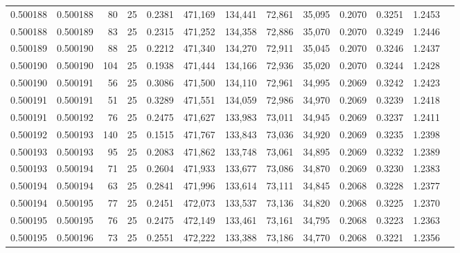 \begin{tabular}{rrrrrrrrrrrrr}
0.500188 & 0.500188 &  80 &  25 &                                     0.2381 & 471,169 & 134,441 &  72,861 &  35,095 & 0.2070 & 0.3251 & 1.2453 \\
0.500188 & 0.500189 &  83 &  25 &                                     0.2315 & 471,252 & 134,358 &  72,886 &  35,070 & 0.2070 & 0.3249 & 1.2446 \\
0.500189 & 0.500190 &  88 &  25 &                                     0.2212 & 471,340 & 134,270 &  72,911 &  35,045 & 0.2070 & 0.3246 & 1.2437 \\
0.500190 & 0.500190 & 104 &  25 &                                     0.1938 & 471,444 & 134,166 &  72,936 &  35,020 & 0.2070 & 0.3244 & 1.2428 \\
0.500190 & 0.500191 &  56 &  25 &                                     0.3086 & 471,500 & 134,110 &  72,961 &  34,995 & 0.2069 & 0.3242 & 1.2423 \\
0.500191 & 0.500191 &  51 &  25 &                                     0.3289 & 471,551 & 134,059 &  72,986 &  34,970 & 0.2069 & 0.3239 & 1.2418 \\
0.500191 & 0.500192 &  76 &  25 &                                     0.2475 & 471,627 & 133,983 &  73,011 &  34,945 & 0.2069 & 0.3237 & 1.2411 \\
0.500192 & 0.500193 & 140 &  25 &                                     0.1515 & 471,767 & 133,843 &  73,036 &  34,920 & 0.2069 & 0.3235 & 1.2398 \\
0.500193 & 0.500193 &  95 &  25 &                                     0.2083 & 471,862 & 133,748 &  73,061 &  34,895 & 0.2069 & 0.3232 & 1.2389 \\
0.500193 & 0.500194 &  71 &  25 &                                     0.2604 & 471,933 & 133,677 &  73,086 &  34,870 & 0.2069 & 0.3230 & 1.2383 \\
0.500194 & 0.500194 &  63 &  25 &                                     0.2841 & 471,996 & 133,614 &  73,111 &  34,845 & 0.2068 & 0.3228 & 1.2377 \\
0.500194 & 0.500195 &  77 &  25 &                                     0.2451 & 472,073 & 133,537 &  73,136 &  34,820 & 0.2068 & 0.3225 & 1.2370 \\
0.500195 & 0.500195 &  76 &  25 &                                     0.2475 & 472,149 & 133,461 &  73,161 &  34,795 & 0.2068 & 0.3223 & 1.2363 \\
0.500195 & 0.500196 &  73 &  25 &                                     0.2551 & 472,222 & 133,388 &  73,186 &  34,770 & 0.2068 & 0.3221 & 1.2356 \\

\end{tabular}
